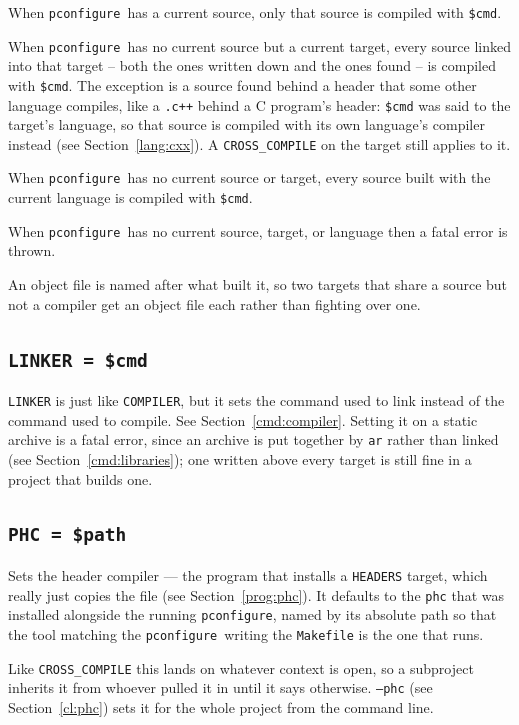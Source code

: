 \documentclass{article}
\newcommand{\pconfigure}{\texttt{pconfigure}}
\begin{document}
When \pconfigure\ has a current source, only that source is compiled
with \texttt{\$cmd}.

When \pconfigure\ has no current source but a current target, every
source linked into that target -- both the ones written down and the
ones found -- is compiled with \texttt{\$cmd}.  The exception is a
source found behind a header that some other language compiles, like
a \texttt{.c++} behind a C program's header: \texttt{\$cmd} was said to
the target's language, so that source is compiled with its own
language's compiler instead (see Section~\ref{lang:cxx}).  A
\texttt{CROSS\_COMPILE} on the target still applies to it.

When \pconfigure\ has no current source or target, every source built
with the current language is compiled with \texttt{\$cmd}.

When \pconfigure\ has no current source, target, or language then a
fatal error is thrown.

An object file is named after what built it, so two targets that share
a source but not a compiler get an object file each rather than
fighting over one.

\subsection{\texttt{LINKER = \$cmd}}

\texttt{LINKER} is just like \texttt{COMPILER}, but it sets the
command used to link instead of the command used to compile.  See
Section~\ref{cmd:compiler}.  Setting it on a static archive is a
fatal error, since an archive is put together by \texttt{ar} rather
than linked (see Section~\ref{cmd:libraries}); one written above
every target is still fine in a project that builds one.

\subsection{\texttt{PHC = \$path} \label{cmd:phc}}

Sets the header compiler --- the program that installs a
\texttt{HEADERS} target, which really just copies the file (see
Section~\ref{prog:phc}).  It defaults to the \texttt{phc} that was
installed alongside the running \pconfigure, named by its absolute
path so that the tool matching the \pconfigure\ writing the
\texttt{Makefile} is the one that runs.

Like \texttt{CROSS\_COMPILE} this lands on whatever context is open,
so a subproject inherits it from whoever pulled it in until it says
otherwise.  \texttt{--phc} (see Section~\ref{cl:phc}) sets it for the
whole project from the command line.
\end{document}
